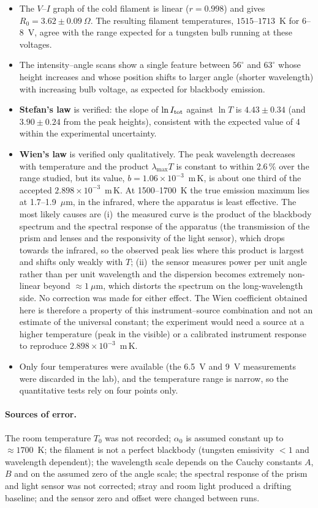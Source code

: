 \documentclass[11pt,a4paper]{article}
\begin{document}
\begin{itemize}
  \item The $V$--$I$ graph of the cold filament is linear ($r=0.998$) and gives $R_0=3.62\pm0.09~\Omega$. The resulting filament temperatures, $1515$--$1713$~K for 6--8~V, agree with the range expected for a tungsten bulb running at these voltages.
  \item The intensity--angle scans show a single feature between $56^\circ$ and $63^\circ$ whose height increases and whose position shifts to larger angle (shorter wavelength) with increasing bulb voltage, as expected for blackbody emission.
  \item \textbf{Stefan's law} is verified: the slope of $\ln I_{\rm tot}$ against $\ln T$ is $4.43\pm0.34$ (and $3.90\pm0.24$ from the peak heights), consistent with the expected value of 4 within the experimental uncertainty.
  \item \textbf{Wien's law} is verified only qualitatively. The peak wavelength decreases with temperature and the product $\lambda_{\max}T$ is constant to within 2.6\,\% over the range studied, but its value, $b=1.06\times10^{-3}$~m\,K, is about one third of the accepted $2.898\times10^{-3}$~m\,K. At 1500--1700~K the true emission maximum lies at 1.7--1.9~$\mu$m, in the infrared, where the apparatus is least effective. The most likely causes are (i)~the measured curve is the product of the blackbody spectrum and the spectral response of the apparatus (the transmission of the prism and lenses and the responsivity of the light sensor), which drops towards the infrared, so the observed peak lies where this product is largest and shifts only weakly with $T$; (ii)~the sensor measures power per unit angle rather than per unit wavelength and the dispersion becomes extremely non-linear beyond $\approx1~\mu$m, which distorts the spectrum on the long-wavelength side. No correction was made for either effect. The Wien coefficient obtained here is therefore a property of this instrument--source combination and not an estimate of the universal constant; the experiment would need a source at a higher temperature (peak in the visible) or a calibrated instrument response to reproduce $2.898\times10^{-3}$~m\,K.
  \item Only four temperatures were available (the 6.5~V and 9~V measurements were discarded in the lab), and the temperature range is narrow, so the quantitative tests rely on four points only.
\end{itemize}

\paragraph{Sources of error.} The room temperature $T_0$ was not recorded; $\alpha_0$ is assumed constant up to $\approx1700$~K; the filament is not a perfect blackbody (tungsten emissivity $<1$ and wavelength dependent); the wavelength scale depends on the Cauchy constants $A$, $B$ and on the assumed zero of the angle scale; the spectral response of the prism and light sensor was not corrected; stray and room light produced a drifting baseline; and the sensor zero and offset were changed between runs.
\end{document}
